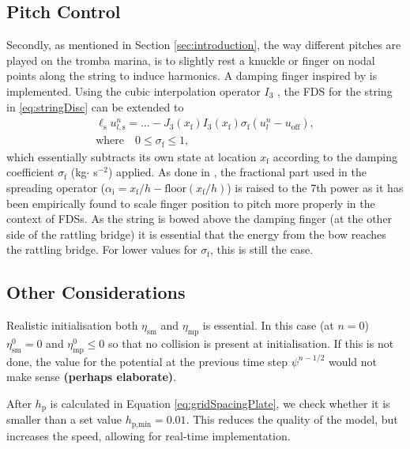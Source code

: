 \documentclass[dvipsnames, pdftex]{article}
\begin{document}
\subsection{Pitch Control}
Secondly, as mentioned in Section \ref{sec:introduction}, the way different pitches are played on the tromba marina, is to slightly rest a knuckle or finger on nodal points along the string to induce harmonics. A damping finger inspired by \cite{Willemsen2019:SMC2020} is implemented. Using the cubic interpolation operator $I_3$ \cite{bilbao2009numerical}, the FDS for the string in \eqref{eq:stringDisc} can be extended to
\begin{gather}\label{eq:dampingFinger}
    \ell_\text{s} u_{l,\text{s}}^n = \hdots - J_3(x_\text{f})I_3(x_\text{f})\sigma_\text{f}(u^n_l-u_\text{off}),\\
   \text{where} \quad 0\leq \sigma_\text{f} \leq 1,\nonumber
\end{gather}
which essentially subtracts its own state at location $x_\text{f}$ according to the damping coefficient $\sigma_\text{f}$ (kg$ \cdot$ s$^{-2}$) applied. As done in \cite{Willemsen2019:SMC2020}, the fractional part used in the spreading operator ($\alpha_\text{i} = x_\text{f}/h - \text{floor}(x_\text{f}/h)$) is raised to the 7th power as it has been empirically found to scale finger position to pitch more properly in the context of FDSs. As the string is bowed above the damping finger (at the other side of the rattling bridge) it is   essential that the energy from the bow reaches the rattling bridge. For lower values for $\sigma_\text{f}$, this is still the case.

\subsection{Other Considerations}
Realistic initialisation both $\eta_\text{sm}$ and $\eta_\text{mp}$ is essential. In this case (at $n=0$) $\eta_\text{sm}^0 = 0$ and $\eta_\text{mp}^0 \leq 0$ so that no collision is present at initialisation. If this is not done, the value for the potential at the previous time step $\psi^{n-1/2}$ would not make sense \textbf{(perhaps elaborate)}.

After $h_\text{p}$ is calculated in Equation \eqref{eq:gridSpacingPlate}, we check whether it is smaller than a set value $h_{\text{p},\text{min}} = 0.01$. This reduces the quality of the model, but increases the speed, allowing for real-time implementation.
\end{document}
